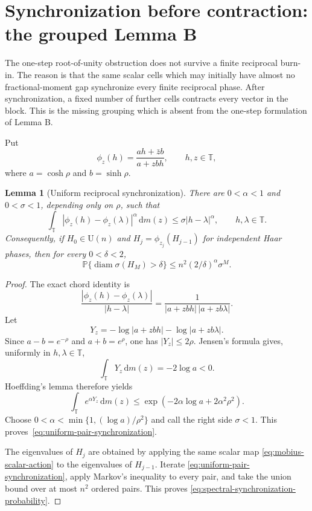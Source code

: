 \documentclass[11pt]{article}
\newtheorem{lemma}[theorem]{Lemma}
\theoremstyle{remark}
\newcommand{\T}{\mathbb T}
\newcommand{\dd}{\,\mathrm d}
\newcommand{\U}{\mathrm U}
\begin{document}
\section{Synchronization before contraction: the grouped Lemma B}

The one-step root-of-unity obstruction does not survive a finite reciprocal
burn-in.  The reason is that the same scalar cells which may initially have
almost no fractional-moment gap synchronize every finite reciprocal phase.
After synchronization, a fixed number of further cells contracts every
vector in the block.  This is the missing grouping which is absent from the
one-step formulation of Lemma B.

Put
\begin{equation}
 \phi_z(h)=\frac{ah+\bar z b}{a+zbh},
 \qquad h,z\in\T,
 \label{eq:mobius-scalar-action}
\end{equation}
where $a=\cosh\rho$ and $b=\sinh\rho$.

\begin{lemma}[Uniform reciprocal synchronization]
\label{lem:uniform-reciprocal-synchronization}
There are $0<\alpha<1$ and $0<\sigma<1$, depending only on $\rho$, such that
\begin{equation}
 \int_\T |\phi_z(h)-\phi_z(\lambda)|^\alpha\dd m(z)
 \leq \sigma |h-\lambda|^\alpha,
 \qquad h,\lambda\in\T.
 \label{eq:uniform-pair-synchronization}
\end{equation}
Consequently, if $H_0\in\U(n)$ and
$H_j=\phi_{z_j}(H_{j-1})$ for independent Haar phases, then for every
$0<\delta<2$,
\begin{equation}
 \mathbb P\{\operatorname{diam}\sigma(H_M)>\delta\}
 \leq n^2(2/\delta)^\alpha\sigma^M.
 \label{eq:spectral-synchronization-probability}
\end{equation}
\end{lemma}

\begin{proof}
The exact chord identity is
\begin{equation}
 \frac{|\phi_z(h)-\phi_z(\lambda)|}{|h-\lambda|}
 =\frac1{|a+zbh|\,|a+zb\lambda|}.
 \label{eq:mobius-chord-ratio}
\end{equation}
Let
\[
 Y_z=-\log|a+zbh|-\log|a+zb\lambda|.
\]
Since $a-b=e^{-\rho}$ and $a+b=e^\rho$, one has
$|Y_z|\leq2\rho$.  Jensen's formula gives, uniformly in
$h,\lambda\in\T$,
\[
 \int_\T Y_z\dd m(z)=-2\log a<0.
\]
Hoeffding's lemma therefore yields
\begin{equation}
 \int_\T e^{\alpha Y_z}\dd m(z)
 \leq \exp\!\left(-2\alpha\log a+2\alpha^2\rho^2\right).
 \label{eq:pair-hoeffding}
\end{equation}
Choose $0<\alpha<\min\{1,(\log a)/\rho^2\}$ and call the right side
$\sigma<1$.  This proves~\eqref{eq:uniform-pair-synchronization}.

The eigenvalues of $H_j$ are obtained by applying the same scalar map
\eqref{eq:mobius-scalar-action} to the eigenvalues of $H_{j-1}$.  Iterate
\eqref{eq:uniform-pair-synchronization}, apply Markov's inequality to every
pair, and take the union bound over at most $n^2$ ordered pairs.  This proves
\eqref{eq:spectral-synchronization-probability}.
\end{proof}
\end{document}
